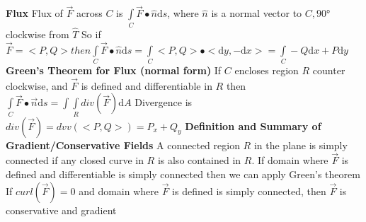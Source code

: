 \documentclass[twoside]{article}
\begin{document}
\indent
\textbf{Flux}\newline
\indent\indent
Flux of $\vec{F}$ across $C$ is $\int\limits_C \vec{F} \bullet \hat{n} \mathrm{d}s$, where $\hat{n}$ is a normal vector to $C,\ang{90}$ clockwise from $\hat{T}$ \newline
\indent\indent
So if $\vec{F} = <P,Q> then \int\limits_C \vec{F} \bullet \hat{n} \mathrm{d}s = \int\limits_C <P,Q> \bullet <\mathrm{d}y,-\mathrm{d}x> = \int\limits_C -Q\mathrm{d}x + P\mathrm{d}y$\newline\newline
\indent
\textbf{Green's Theorem for Flux (normal form)}\newline
\indent\indent
If $C$ encloses region $R$ counter clockwise, and $\vec{F}$ is defined and differentiable in $R$ then $\int\limits_C \vec{F} \bullet \vec{n} \mathrm{d}s = \int\int\limits_R div(\vec{F})\mathrm{d}A$\newline
\indent\indent
Divergence is $div(\vec{F}) = dvv(<P,Q>) = P_{x} + Q_{y}$\newline\newline
\indent
\textbf{Definition and Summary of Gradient/Conservative Fields}\newline
\indent\indent
A connected region $R$ in the plane is simply connected if any closed curve in $R$ is also contained in $R$.\newline
\indent\indent
If domain where $\vec{F}$ is defined and differentiable is simply connected then we can apply Green's theorem\newline
\indent\indent
If $curl(\vec{F}) = 0$ and domain where $\vec{F}$ is defined is simply connected, then $\vec{F}$ is conservative and gradient\newline
\end{document}
